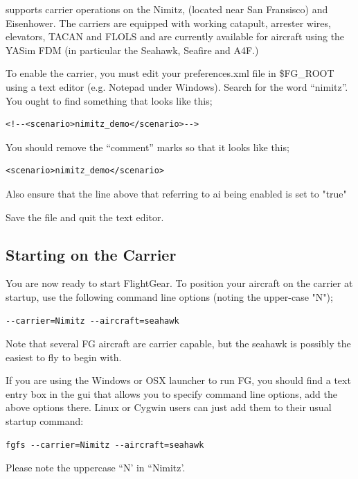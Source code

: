 \FlightGear{} supports carrier operations on the Nimitz, (located near San Fransisco) and Eisenhower. 
The carriers are equipped with working catapult, arrester wires, elevators, TACAN and FLOLS and 
are currently available for aircraft using the YASim FDM (in particular the Seahawk, Seafire and A4F.)

To enable the carrier, you must edit your preferences.xml file in \$FG\_ROOT using a text editor (e.g. Notepad
under Windows). Search for the word ``nimitz''. You ought to find something that looks like this;

\begin{verbatim}
<!--<scenario>nimitz_demo</scenario>--> 
\end{verbatim}

You should remove the ``comment'' marks so that it looks like this;


\begin{verbatim}
<scenario>nimitz_demo</scenario> 
\end{verbatim}

Also ensure that the line above that referring to ai being enabled is set to "true"

Save the file and quit the text editor.

\subsection{Starting on the Carrier}

You are now ready to start FlightGear. To position your aircraft on the carrier at startup, 
use the following command line options (noting the upper-case "N");

\begin{verbatim}
--carrier=Nimitz --aircraft=seahawk 
\end{verbatim}

Note that several FG aircraft are carrier capable, but the seahawk is possibly the easiest to fly to begin with.

If you are using the Windows or OSX launcher to run FG, you should find a text entry box in the gui that 
allows you to specify command line options, add the above options there. Linux or Cygwin users can just 
add them to their usual startup command: 

\begin{verbatim}
fgfs --carrier=Nimitz --aircraft=seahawk
\end{verbatim}

Please note the uppercase ``N' in ``Nimitz'.

